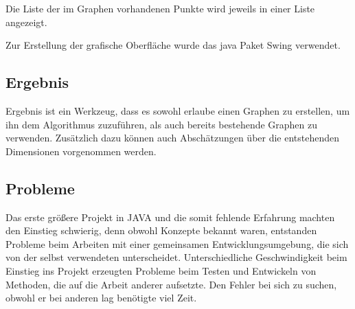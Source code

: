 \documentclass[11pt]{article}
\begin{document}
Die Liste der im Graphen vorhandenen Punkte wird jeweils in einer Liste angezeigt.

Zur Erstellung der grafische Oberfläche wurde das java Paket Swing verwendet.
\subsection{Ergebnis}
Ergebnis ist ein Werkzeug, dass es sowohl erlaube einen Graphen zu erstellen, um ihn dem Algorithmus zuzuführen, als auch bereits bestehende Graphen zu verwenden. Zusätzlich dazu können auch Abschätzungen über die entstehenden Dimensionen vorgenommen werden. 
\subsection{Probleme}
Das erste größere Projekt in JAVA und die somit fehlende Erfahrung machten den Einstieg schwierig, denn obwohl Konzepte bekannt waren, entstanden Probleme beim Arbeiten mit einer gemeinsamen Entwicklungsumgebung, die sich von der selbst verwendeten unterscheidet.
Unterschiedliche Geschwindigkeit beim Einstieg ins Projekt erzeugten Probleme beim Testen und Entwickeln von Methoden, die auf die Arbeit anderer aufsetzte. Den Fehler bei sich zu suchen, obwohl er bei anderen lag benötigte viel Zeit.
\end{document}

